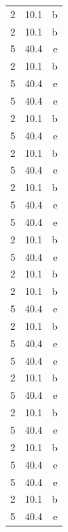 \documentclass{article}
\begin{document}
\begin{longtable}[c]{l|S|r}
	2 & 10.1 & b \\ 
	2 & 10.1 & b \\ 
	5 & 40.4 & e \\ 
	2 & 10.1 & b \\ 
	5 & 40.4 & e \\ 
	5 & 40.4 & e \\ 
	2 & 10.1 & b \\ 
	5 & 40.4 & e \\ 
	2 & 10.1 & b \\ 
	5 & 40.4 & e \\ 
	2 & 10.1 & b \\ 
	5 & 40.4 & e \\ 
	5 & 40.4 & e \\ 
	2 & 10.1 & b \\ 
	5 & 40.4 & e \\ 
	2 & 10.1 & b \\ 
	2 & 10.1 & b \\ 
	5 & 40.4 & e \\ 
	2 & 10.1 & b \\ 
	5 & 40.4 & e \\ 
	5 & 40.4 & e \\ 
	2 & 10.1 & b \\ 
	5 & 40.4 & e \\ 
	2 & 10.1 & b \\ 
	5 & 40.4 & e \\ 
	2 & 10.1 & b \\ 
	5 & 40.4 & e \\ 
	5 & 40.4 & e \\ 
	2 & 10.1 & b \\ 
	5 & 40.4 & e \\ 
	\bottomrule
    \end{longtable}

    \newpage
    
    \begin{appendix}
	\listoffigures
	\listoftables
    \end{appendix}
\end{document}

